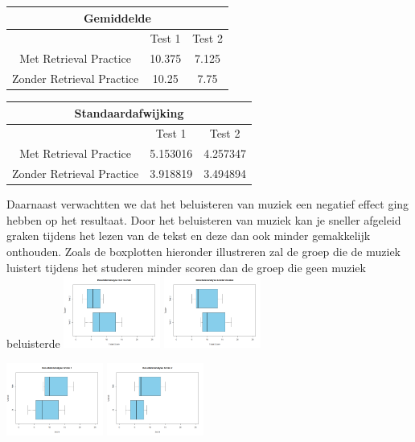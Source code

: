 \documentclass{hogent-article}
\begin{document}
	\begin{tabular}{ |c|c|c| }
	\hline
		\multicolumn{3}{|c|}{Gemiddelde} \\
	\hline
		& Test 1 & Test 2 \\
	\hline
		Met Retrieval Practice & 10.375 & 7.125 \\
		Zonder Retrieval Practice & 10.25 & 7.75 \\
	\hline
	\end{tabular}
	
	\begin{tabular}{ |c|c|c| }
	\hline
		\multicolumn{3}{|c|}{Standaardafwijking} \\
	\hline
		& Test 1 & Test 2 \\
	\hline
		Met Retrieval Practice & 5.153016 & 4.257347 \\
		Zonder Retrieval Practice & 3.918819 & 3.494894 \\
	\hline
	\end{tabular}
	
	Daarnaast verwachtten we dat het beluisteren van muziek een negatief effect ging hebben op het resultaat. Door het beluisteren van muziek kan je sneller afgeleid graken tijdens het lezen van de tekst en deze dan ook minder gemakkelijk onthouden. Zoals de boxplotten hieronder illustreren zal de groep die de muziek luistert tijdens het studeren minder scoren dan de groep die geen muziek beluisterde
	\includegraphics[width=120px]{Verwacht_Muziek}
	\includegraphics[width=120px]{Verwacht_ZonderMuziek}
	
	\includegraphics[width=120px]{Verwacht_Muziek_Score1}
	\includegraphics[width=120px]{Verwacht_Muziek_Score2}
	
\end{document}
